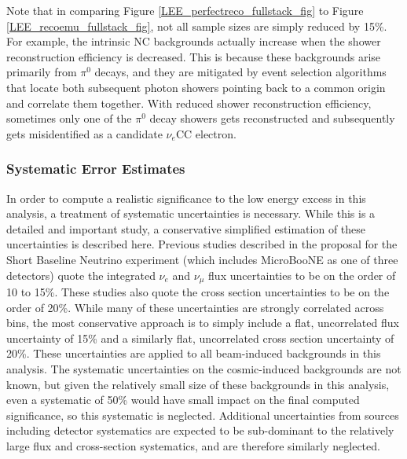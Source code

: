 Note that in comparing Figure \ref{LEE_perfectreco_fullstack_fig} to Figure \ref{LEE_recoemu_fullstack_fig}, not all sample sizes are simply reduced by 15\%. For example, the intrinsic NC backgrounds actually increase when the shower reconstruction efficiency is decreased. This is because these backgrounds arise primarily from $\pi^0$ decays, and they are mitigated by event selection algorithms that locate both subsequent photon showers pointing back to a common origin and correlate them together. With reduced shower reconstruction efficiency, sometimes only one of the $\pi^0$ decay showers gets reconstructed and subsequently gets misidentified as a candidate $\nu_e$CC electron.

\subsubsection{Systematic Error Estimates}

In order to compute a realistic significance to the low energy excess in this analysis, a treatment of systematic uncertainties is necessary. While this is a detailed and important study, a conservative simplified estimation of these uncertainties is described here. Previous studies described in the proposal for the Short Baseline Neutrino experiment (which includes MicroBooNE as one of three detectors) \cite{SBNproposal} quote the integrated $\nu_e$ and $\nu_\mu$ flux uncertainties to be on the order of 10 to 15\%. These studies also quote the cross section uncertainties to be on the order of 20\%. While many of these uncertainties are strongly correlated across bins, the most conservative approach is to simply include a flat, uncorrelated flux uncertainty of 15\% and a similarly flat, uncorrelated cross section uncertainty of 20\%. These uncertainties are applied to all beam-induced backgrounds in this analysis. The systematic uncertainties on the cosmic-induced backgrounds are not known, but given the relatively small size of these backgrounds in this analysis, even a systematic of 50\% would have small impact on the final computed significance, so this systematic is neglected. Additional uncertainties from sources including detector systematics are expected to be sub-dominant to the relatively large flux and cross-section systematics, and are therefore similarly neglected.\\

